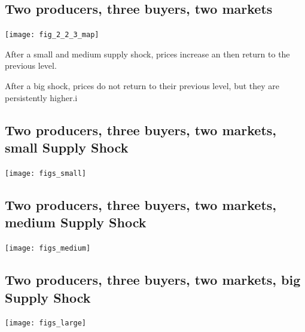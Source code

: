 \documentclass{article}
\begin{document}
\subsection{Two producers, three buyers, two markets}

\texttt{[image: fig\_2\_2\_3\_map]}

After a small and medium supply shock, prices increase an then return to the previous level.

After a big shock, prices do not return to their previous level, but they are persistently higher.i


\newpage
\subsection{Two producers, three buyers, two markets, small Supply Shock}

\texttt{[image: figs\_small]}

\subsection{Two producers, three buyers, two markets, medium Supply Shock}

\texttt{[image: figs\_medium]}

\subsection{Two producers, three buyers, two markets, big Supply Shock}

\texttt{[image: figs\_large]}
\end{document}
